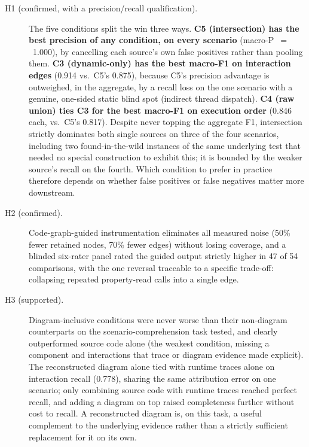 \begin{description}
  \item[H1 (confirmed, with a precision/recall qualification).] The five
    conditions split the win three ways. \textbf{C5 (intersection) has
    the best precision of any condition, on every scenario}
    (macro-P~$=$~1.000), by cancelling each source's own false
    positives rather than pooling them. \textbf{C3 (dynamic-only) has
    the best macro-F1 on interaction edges} (0.914 vs.\ C5's 0.875),
    because C5's precision advantage is outweighed, in the aggregate,
    by a recall loss on the one scenario with a genuine, one-sided
    static blind spot (indirect thread dispatch). \textbf{C4 (raw
    union) ties C3 for the best macro-F1 on execution order} (0.846
    each, vs.\ C5's 0.817). Despite never topping the aggregate F1, intersection strictly
    dominates both single sources on three of the four scenarios,
    including two found-in-the-wild instances of the same underlying
    test that needed no special construction to exhibit this; it is
    bounded by the weaker source's recall on the fourth. Which condition
    to prefer in practice therefore depends on whether false positives
    or false negatives matter more downstream.

  \item[H2 (confirmed).] Code-graph-guided instrumentation eliminates
    all measured noise (50\% fewer retained nodes, 70\% fewer edges)
    without losing coverage, and a blinded six-rater panel rated the
    guided output strictly higher in 47 of 54 comparisons, with the one
    reversal traceable to a specific trade-off: collapsing repeated
    property-read calls into a single edge.

  \item[H3 (supported).] Diagram-inclusive conditions were never worse
    than their non-diagram counterparts on the scenario-comprehension
    task tested, and clearly outperformed source code alone (the
    weakest condition, missing a component and interactions that trace
    or diagram evidence made explicit). The reconstructed diagram alone
    tied with runtime traces alone on interaction recall (0.778),
    sharing the same attribution error on one scenario; only combining
    source code with runtime traces reached perfect recall, and adding
    a diagram on top raised completeness further without cost to
    recall. A reconstructed diagram is, on this task, a useful
    complement to the underlying evidence rather than a strictly
    sufficient replacement for it on its own.
\end{description}


